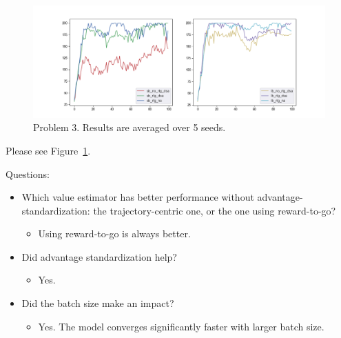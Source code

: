 \begin{figure}[htbp]
    \centering
    \includegraphics[width=0.9\linewidth]{figures/p3.png}
    \caption{Problem 3. Results are averaged over 5 seeds.}
    \label{fig:p3}
\end{figure}
Please see Figure~\ref{fig:p3}.

Questions:

\begin{itemize}
    \item Which value estimator has better performance without advantage-standardization: the trajectory-centric one, or the one using reward-to-go?
    \begin{itemize}
        \item Using reward-to-go is always better.
    \end{itemize}
    \item Did advantage standardization help?
    \begin{itemize}
        \item Yes.
    \end{itemize}
    \item Did the batch size make an impact?
    \begin{itemize}
        \item Yes. The model converges significantly faster with larger batch size.
    \end{itemize}

\end{itemize}
